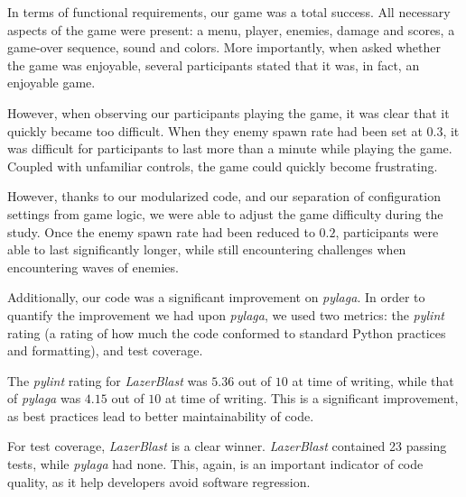 In terms of functional requirements, our game was a
total success.  All necessary aspects of the game
were present: a menu, player, enemies, damage and scores,
a game-over sequence, sound and colors.  More importantly,
when asked whether the game was enjoyable, several
participants stated that it was, in fact, an enjoyable
game.

However, when observing our participants playing the game,
it was clear that it quickly became too difficult.  When
they enemy spawn rate had been set at $0.3$, it was
difficult for participants to last more than a minute
while playing the game.  Coupled with unfamiliar controls,
the game could quickly become frustrating.

However, thanks to our modularized code, and our separation
of configuration settings from game logic, we were able
to adjust the game difficulty during the study.  Once the
enemy spawn rate had been reduced to $0.2$, participants
were able to last significantly longer, while still
encountering challenges when encountering waves of enemies.

Additionally, our code was a significant improvement on
\textit{pylaga}.  In order to quantify the improvement
we had upon \textit{pylaga}, we used two metrics: the
\textit{pylint} rating (a rating of how much the code
conformed to standard Python practices and formatting),
and test coverage.

The \textit{pylint} rating for \textit{LazerBlast} was
$5.36$ out of $10$ at time of writing, while that of
\textit{pylaga} was $4.15$ out of $10$ at time of writing.
This is a significant improvement, as best practices lead
to better maintainability of code.

For test coverage, \textit{LazerBlast} is a clear winner.
\textit{LazerBlast} contained 23 passing tests, while
\textit{pylaga} had none.  This, again, is an important
indicator of code quality, as it help developers avoid
software regression.
